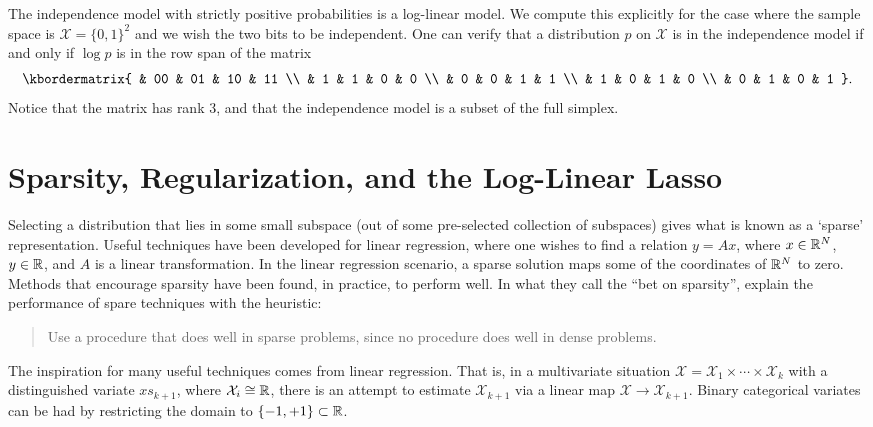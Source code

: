 \documentclass[cclicense]{hmcthesis}
\providecommand*{\xs}{\mathcal X}
\numberwithin{equation}{chapter}
\numberwithin{thmcounter}{chapter}
\begin{document}
    \begin{example}[Independence]
        The independence model with strictly positive probabilities is a
        log-linear model.  We compute this explicitly for the case where the
        sample space is $\xs = \{0, 1\}^2$ and we wish the two bits to be
        independent.  One can verify that a distribution $p$ on $\xs$ is in the
        independence model if and only if $\log p$ is in the row span of the
        matrix
        \[
            \kbordermatrix{
                & 00 & 01 & 10 & 11 \\
                &  1 &  1 &  0 &  0 \\
                &  0 &  0 &  1 &  1 \\
                &  1 &  0 &  1 &  0 \\
                &  0 &  1 &  0 &  1
            }.
        \]
        Notice that the matrix has rank 3, and that the independence model is a
        subset of the full simplex.
    \end{example}


\section{Sparsity, Regularization, and the Log-Linear Lasso}

    Selecting a distribution that lies in some small subspace (out of some
    pre-selected collection of subspaces) gives what is known as a `sparse'
    representation.  Useful techniques have been developed for linear
    regression, where one wishes to find a relation $y = Ax$, where $x \in
    \mathbb{R}^N$, $y \in \mathbb{R}$, and $A$ is a linear transformation.  In the linear
    regression scenario, a sparse solution maps some of the coordinates of
    $\mathbb{R}^N$ to zero.  Methods that encourage sparsity have been found, in
    practice, to perform well.  In what they  call the ``bet on sparsity'',
    \citep{EOSL} explain the performance of spare techniques with the heuristic:
    \begin{quote}
        Use a procedure that does well in sparse problems, since no procedure
        does well in dense problems.
    \end{quote}

    The inspiration for many useful techniques comes from linear regression.
    That is, in a multivariate situation $\xs = \xs_1 \times \cdots \times
    \xs_k$ with a distinguished variate $xs_{k+1}$, where $\xs_i \cong \R$,
    there is an attempt to estimate $\xs_{k+1}$ via a linear map $\xs \to
    \xs_{k+1}$.  Binary categorical variates can be had by restricting the
    domain to $\{-1, +1\} \subset \mathbb{R}$.
\end{document}
